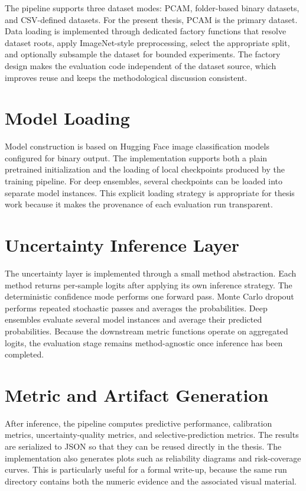 The pipeline supports three dataset modes: PCAM, folder-based binary datasets, and CSV-defined datasets. For the present thesis, PCAM is the primary dataset. Data loading is implemented through dedicated factory functions that resolve dataset roots, apply ImageNet-style preprocessing, select the appropriate split, and optionally subsample the dataset for bounded experiments. The factory design makes the evaluation code independent of the dataset source, which improves reuse and keeps the methodological discussion consistent.

\section{Model Loading}

Model construction is based on Hugging Face image classification models configured for binary output. The implementation supports both a plain pretrained initialization and the loading of local checkpoints produced by the training pipeline. For deep ensembles, several checkpoints can be loaded into separate model instances. This explicit loading strategy is appropriate for thesis work because it makes the provenance of each evaluation run transparent.

\section{Uncertainty Inference Layer}

The uncertainty layer is implemented through a small method abstraction. Each method returns per-sample logits after applying its own inference strategy. The deterministic confidence mode performs one forward pass. Monte Carlo dropout performs repeated stochastic passes and averages the probabilities. Deep ensembles evaluate several model instances and average their predicted probabilities. Because the downstream metric functions operate on aggregated logits, the evaluation stage remains method-agnostic once inference has been completed.

\section{Metric and Artifact Generation}

After inference, the pipeline computes predictive performance, calibration metrics, uncertainty-quality metrics, and selective-prediction metrics. The results are serialized to JSON so that they can be reused directly in the thesis. The implementation also generates plots such as reliability diagrams and risk-coverage curves. This is particularly useful for a formal write-up, because the same run directory contains both the numeric evidence and the associated visual material.

